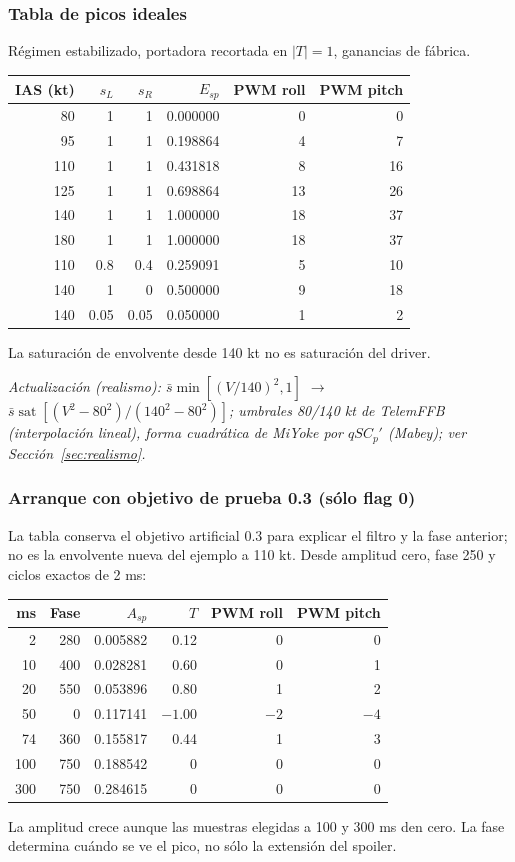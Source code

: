 \documentclass[11pt,a4paper]{article}
\newcommand{\sat}{\operatorname{sat}}
\begin{document}
\subsubsection{Tabla de picos ideales}
Régimen estabilizado, portadora recortada en $|T|=1$, ganancias de fábrica.
\begin{center}\begin{tabular}{rrrrrr}
\toprule IAS (kt)&$s_L$&$s_R$&$E_{sp}$&PWM roll&PWM pitch\\\midrule
80&1&1&0.000000&0&0\\
95&1&1&0.198864&4&7\\
110&1&1&0.431818&8&16\\
125&1&1&0.698864&13&26\\
140&1&1&1.000000&18&37\\
180&1&1&1.000000&18&37\\
110&0.8&0.4&0.259091&5&10\\
140&1&0&0.500000&9&18\\
140&0.05&0.05&0.050000&1&2\\
\bottomrule\end{tabular}\end{center}
La saturación de envolvente desde 140 kt no es saturación del driver.

\textit{Actualización (realismo): $\bar s\min[(V/140)^2,1]$ $\rightarrow$ $\bar s\sat[(V^2-80^2)/(140^2-80^2)]$; umbrales 80/140 kt de TelemFFB (interpolación lineal), forma cuadrática de MiYoke por $qSC_p'$ (Mabey); ver Sección~\ref{sec:realismo}.}

\subsubsection{Arranque con objetivo de prueba 0.3 (sólo flag 0)}
La tabla conserva el objetivo artificial 0.3 para explicar el filtro y la fase anterior; no es la envolvente nueva del ejemplo a 110 kt.
Desde amplitud cero, fase 250 y ciclos exactos de 2 ms:
\begin{center}\begin{tabular}{rrrrrr}
\toprule ms&Fase&$A_{sp}$&$T$&PWM roll&PWM pitch\\\midrule
2&280&0.005882&0.12&0&0\\10&400&0.028281&0.60&0&1\\20&550&0.053896&0.80&1&2\\50&0&0.117141&$-1.00$&$-2$&$-4$\\74&360&0.155817&0.44&1&3\\100&750&0.188542&0&0&0\\300&750&0.284615&0&0&0\\\bottomrule
\end{tabular}\end{center}
La amplitud crece aunque las muestras elegidas a 100 y 300 ms den cero. La fase determina cuándo se ve el pico, no sólo la extensión del spoiler.
\end{document}
